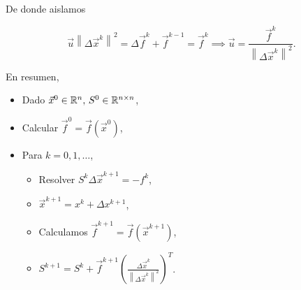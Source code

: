 \noindent De donde aislamos

\[
    \vec{u}\left\|\Delta\vec{x}^k\right\|^2 = \Delta \vec{f}^k + \vec{f}^{k-1} = \vec{f}^k \implies \vec{u} = \frac{\vec{f}^k}{\left\|\Delta\vec{x}^k\right\|^2}.
\]

\noindent En resumen,
\begin{itemize}
    \item Dado $\vec{x}^0\in\mathbb{R}^n,\, S^0 \in \mathbb{R}^{n\times n}$,
    \item Calcular $\vec{f}^0 = \vec{f}\left( \vec{x}^0 \right)$,
    \item Para $k = 0, 1, \dots$,
        \begin{itemize}
            \item Resolver $S^k \Delta \vec{x}^{k+1} = -f^k$,
            \item $\vec{x}^{k+1} = x^k + \Delta x^{k+1}$,
            \item Calculamos $\vec{f}^{k+1} = \vec{f}\left( \vec{x}^{k+1} \right)$,
            \item $S^{k+1} = S^k + \vec{f}^{k+1}\left( \frac{\Delta\vec{x}^k}{\left\|\Delta \vec{x}^k \right\|^2} \right)^T$.
        \end{itemize}
\end{itemize}
